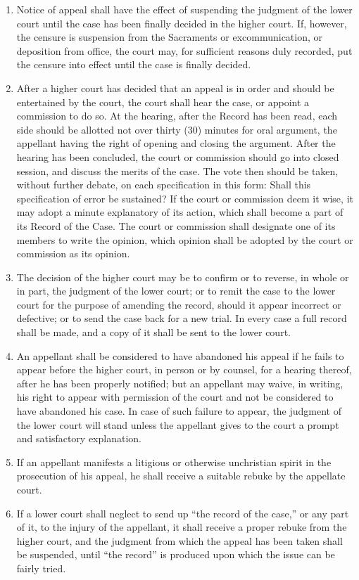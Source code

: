 \documentclass[
]{book}
\begin{document}
\begin{enumerate}
\item
  Notice of appeal shall have the effect of suspending the judgment of the lower court until the case has been finally decided in the higher court. If, however, the censure is suspension from the Sacraments or excommunication, or deposition from office, the court may, for sufficient reasons duly recorded, put the censure into effect until the case is finally decided.
\item
  After a higher court has decided that an appeal is in order and should be entertained by the court, the court shall hear the case, or appoint a commission to do so. At the hearing, after the Record has been read, each side should be allotted not over thirty (30) minutes for oral argument, the appellant having the right of opening and closing the argument. After the hearing has been concluded, the court or commission should go into closed session, and discuss the merits of the case. The vote then should be taken, without further debate, on each specification in this form: Shall this specification of error be sustained? If the court or commission deem it wise, it may adopt a minute explanatory of its action, which shall become a part of its Record of the Case. The court or commission shall designate one of its members to write the opinion, which opinion shall be adopted by the court or commission as its opinion.
\item
  The decision of the higher court may be to confirm or to reverse, in whole or in part, the judgment of the lower court; or to remit the case to the lower court for the purpose of amending the record, should it appear incorrect or defective; or to send the case back for a new trial. In every case a full record shall be made, and a copy of it shall be sent to the lower court.
\item
  An appellant shall be considered to have abandoned his appeal if he fails to appear before the higher court, in person or by counsel, for a hearing thereof, after he has been properly notified; but an appellant may waive, in writing, his right to appear with permission of the court and not be considered to have abandoned his case. In case of such failure to appear, the judgment of the lower court will stand unless the appellant gives to the court a prompt and satisfactory explanation.
\item
  If an appellant manifests a litigious or otherwise unchristian spirit in the prosecution of his appeal, he shall receive a suitable rebuke by the appellate court.
\item
  If a lower court shall neglect to send up ``the record of the case,'' or any part of it, to the injury of the appellant, it shall receive a proper rebuke from the higher court, and the judgment from which the appeal has been taken shall be suspended, until ``the record'' is produced upon which the issue can be fairly tried.
\end{enumerate}
\end{document}

